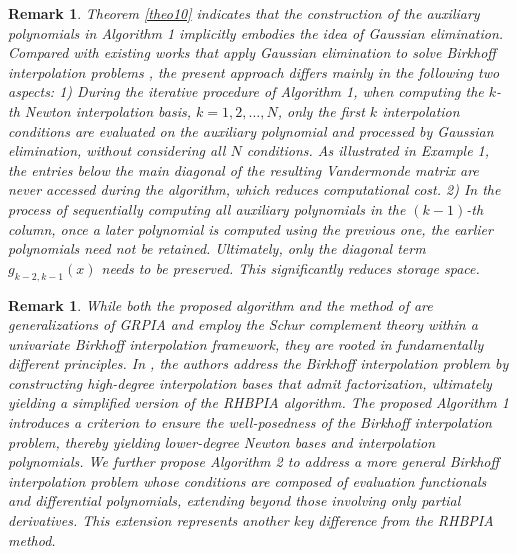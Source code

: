 \documentclass[preprint,12pt]{elsarticle}
\newtheorem{remark}[theorem]{Remark}
\begin{document}
\begin{remark}
Theorem \ref{theo10} indicates that the construction of 
 the auxiliary polynomials in Algorithm 1 implicitly embodies the idea of Gaussian elimination. Compared with existing works that apply Gaussian elimination to solve Birkhoff interpolation problems \cite{lei}, the present approach differs mainly in the following two aspects: 1) During the iterative procedure of Algorithm 1, when computing the $k$-th Newton interpolation basis, $k=1,2,\dots,N$, only the first $k$ interpolation conditions are evaluated on the auxiliary polynomial and processed by Gaussian elimination, without considering all $N$ conditions. As illustrated in Example 1, the entries below the main diagonal of the resulting Vandermonde matrix are never accessed during the algorithm, which reduces computational cost.
 2) In the process of sequentially computing all auxiliary polynomials in the $(k-1)$-th column, once a later polynomial is computed using the previous one, the earlier polynomials need not be retained. Ultimately, only the diagonal term $g_{k-2,k-1}(x)$ needs to be preserved. This  significantly reduces storage space.
\end{remark}

\begin{remark}
While both the proposed algorithm and the method of \cite{wen27} are generalizations of GRPIA \cite{wen20} and employ the Schur complement theory within a univariate Birkhoff interpolation framework, they are rooted in fundamentally different principles. In \cite{wen27},  the authors address the Birkhoff interpolation problem by constructing high-degree interpolation bases that admit factorization, ultimately yielding a simplified version of the RHBPIA algorithm. The proposed Algorithm 1 introduces a criterion to ensure the well-posedness of the Birkhoff interpolation problem, thereby yielding lower-degree Newton bases and interpolation polynomials. We further propose Algorithm 2 to address a more general Birkhoff interpolation problem whose conditions are composed of evaluation functionals and differential polynomials, extending beyond those involving only partial derivatives. This extension represents another key difference from the RHBPIA method.
\end{remark}
\end{document}
